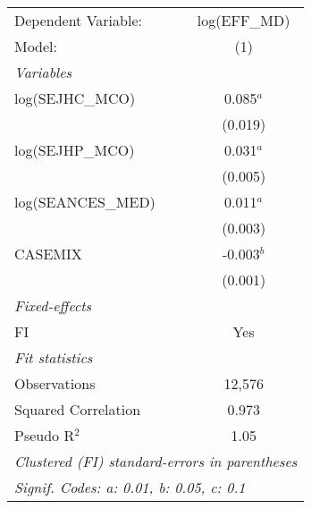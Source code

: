 
\begingroup
\centering
\begin{tabular}{lc}
   \tabularnewline \midrule \midrule
   Dependent Variable: & log(EFF\_MD)\\   
   Model:              & (1)\\  
   \midrule
   \emph{Variables}\\
   log(SEJHC\_MCO)     & 0.085$^{a}$\\   
                       & (0.019)\\   
   log(SEJHP\_MCO)     & 0.031$^{a}$\\   
                       & (0.005)\\   
   log(SEANCES\_MED)   & 0.011$^{a}$\\   
                       & (0.003)\\   
   CASEMIX             & -0.003$^{b}$\\   
                       & (0.001)\\   
   \midrule
   \emph{Fixed-effects}\\
   FI                  & Yes\\  
   \midrule
   \emph{Fit statistics}\\
   Observations        & 12,576\\  
   Squared Correlation & 0.973\\  
   Pseudo R$^2$        & 1.05\\  
   \midrule \midrule
   \multicolumn{2}{l}{\emph{Clustered (FI) standard-errors in parentheses}}\\
   \multicolumn{2}{l}{\emph{Signif. Codes: a: 0.01, b: 0.05, c: 0.1}}\\
\end{tabular}
\par\endgroup



